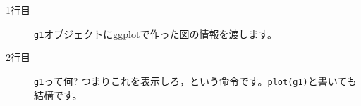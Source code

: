 \begin{description}
	\item[1行目] \texttt{g1}オブジェクトにggplotで作った図の情報を渡します。
	\item[2行目] \texttt{g1}って何? つまりこれを表示しろ，という命令です。\texttt{plot(g1)}と書いても結構です。
\end{description}
